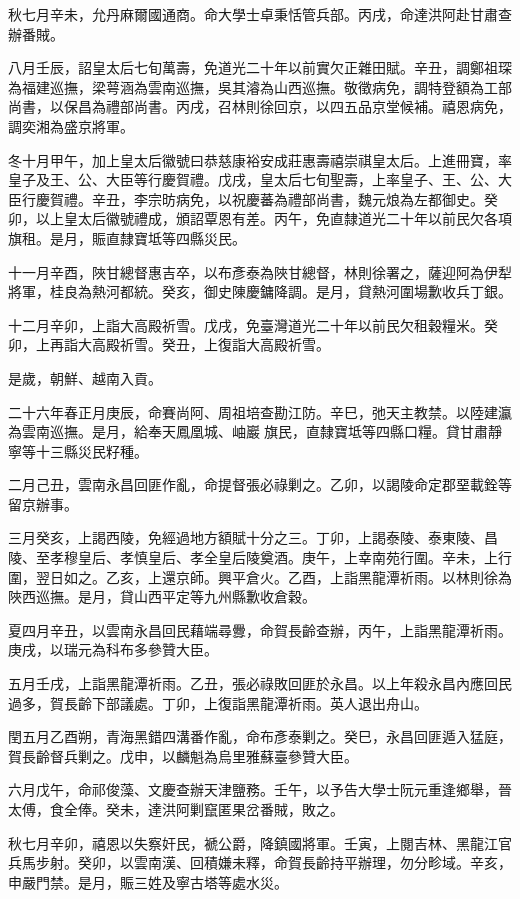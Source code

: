 \begin{pinyinscope}
秋七月辛未，允丹麻爾國通商。命大學士卓秉恬管兵部。丙戌，命達洪阿赴甘肅查辦番賊。

八月壬辰，詔皇太后七旬萬壽，免道光二十年以前實欠正雜田賦。辛丑，調鄭祖琛為福建巡撫，梁萼涵為雲南巡撫，吳其濬為山西巡撫。敬徵病免，調特登額為工部尚書，以保昌為禮部尚書。丙戌，召林則徐回京，以四五品京堂候補。禧恩病免，調奕湘為盛京將軍。

冬十月甲午，加上皇太后徽號曰恭慈康裕安成莊惠壽禧崇祺皇太后。上進冊寶，率皇子及王、公、大臣等行慶賀禮。戊戌，皇太后七旬聖壽，上率皇子、王、公、大臣行慶賀禮。辛丑，李宗昉病免，以祝慶蕃為禮部尚書，魏元烺為左都御史。癸卯，以上皇太后徽號禮成，頒詔覃恩有差。丙午，免直隸道光二十年以前民欠各項旗租。是月，賑直隸寶坻等四縣災民。

十一月辛酉，陜甘總督惠吉卒，以布彥泰為陜甘總督，林則徐署之，薩迎阿為伊犁將軍，桂良為熱河都統。癸亥，御史陳慶鏞降調。是月，貸熱河圍場歉收兵丁銀。

十二月辛卯，上詣大高殿祈雪。戊戌，免臺灣道光二十年以前民欠租穀糧米。癸卯，上再詣大高殿祈雪。癸丑，上復詣大高殿祈雪。

是歲，朝鮮、越南入貢。

二十六年春正月庚辰，命賽尚阿、周祖培查勘江防。辛巳，弛天主教禁。以陸建瀛為雲南巡撫。是月，給奉天鳳凰城、岫巖旗民，直隸寶坻等四縣口糧。貸甘肅靜寧等十三縣災民籽種。

二月己丑，雲南永昌回匪作亂，命提督張必祿剿之。乙卯，以謁陵命定郡堊載銓等留京辦事。

三月癸亥，上謁西陵，免經過地方額賦十分之三。丁卯，上謁泰陵、泰東陵、昌陵、至孝穆皇后、孝慎皇后、孝全皇后陵奠酒。庚午，上幸南苑行圍。辛未，上行圍，翌日如之。乙亥，上還京師。興平倉火。乙酉，上詣黑龍潭祈雨。以林則徐為陜西巡撫。是月，貸山西平定等九州縣歉收倉穀。

夏四月辛丑，以雲南永昌回民藉端尋釁，命賀長齡查辦，丙午，上詣黑龍潭祈雨。庚戌，以瑞元為科布多參贊大臣。

五月壬戌，上詣黑龍潭祈雨。乙丑，張必祿敗回匪於永昌。以上年殺永昌內應回民過多，賀長齡下部議處。丁卯，上復詣黑龍潭祈雨。英人退出舟山。

閏五月乙酉朔，青海黑錯四溝番作亂，命布彥泰剿之。癸巳，永昌回匪遁入猛庭，賀長齡督兵剿之。戊申，以麟魁為烏里雅蘇臺參贊大臣。

六月戊午，命祁俊藻、文慶查辦天津鹽務。壬午，以予告大學士阮元重逢鄉舉，晉太傅，食全俸。癸未，達洪阿剿竄匿果岔番賊，敗之。

秋七月辛卯，禧恩以失察奸民，褫公爵，降鎮國將軍。壬寅，上閱吉林、黑龍江官兵馬步射。癸卯，以雲南漢、回積嫌未釋，命賀長齡持平辦理，勿分畛域。辛亥，申嚴門禁。是月，賑三姓及寧古塔等處水災。


\end{pinyinscope}
